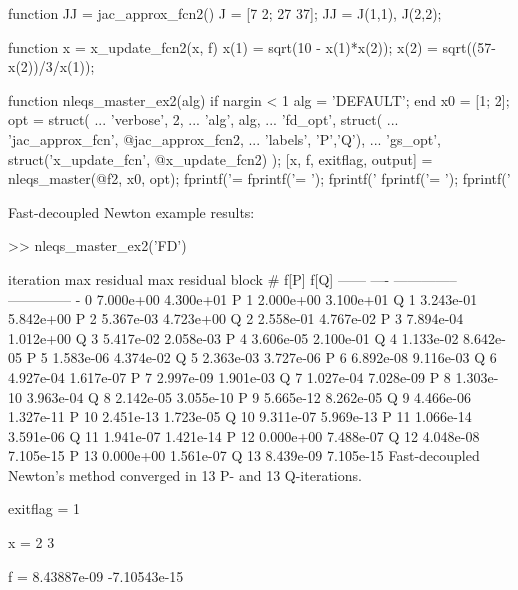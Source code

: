 \documentclass[12pt]{article}
\numberwithin{equation}{section}
\numberwithin{table}{section}
\numberwithin{figure}{section}
\begin{document}
\begin{Code}
function JJ = jac_approx_fcn2()
J = [7 2; 27 37];
JJ = {J(1,1), J(2,2)};
\end{Code}

\begin{Code}
function x = x_update_fcn2(x, f)
x(1) = sqrt(10 - x(1)*x(2));
x(2) = sqrt((57-x(2))/3/x(1));
\end{Code}

\begin{Code}
function nleqs_master_ex2(alg)
if nargin < 1
    alg = 'DEFAULT';
end
x0 = [1; 2];
opt = struct( ...
    'verbose', 2, ...
    'alg', alg, ...
    'fd_opt', struct( ...
        'jac_approx_fcn', @jac_approx_fcn2, ...
        'labels', {{'P','Q'}}), ...
    'gs_opt', struct('x_update_fcn', @x_update_fcn2) );
[x, f, exitflag, output] = nleqs_master(@f2, x0, opt);
fprintf('\nexitflag = %
fprintf('\nx = \n');
fprintf('   %
fprintf('\nf = \n');
fprintf('   %
\end{Code}

\clearpage
\noindent Fast-decoupled Newton example results:
\begin{Code}
>> nleqs_master_ex2('FD')

 iteration    max residual    max residual 
block    #        f[P]            f[Q]     
------ ----  --------------  --------------
  -      0       7.000e+00       4.300e+01
  P      1       2.000e+00       3.100e+01
  Q      1       3.243e-01       5.842e+00
  P      2       5.367e-03       4.723e+00
  Q      2       2.558e-01       4.767e-02
  P      3       7.894e-04       1.012e+00
  Q      3       5.417e-02       2.058e-03
  P      4       3.606e-05       2.100e-01
  Q      4       1.133e-02       8.642e-05
  P      5       1.583e-06       4.374e-02
  Q      5       2.363e-03       3.727e-06
  P      6       6.892e-08       9.116e-03
  Q      6       4.927e-04       1.617e-07
  P      7       2.997e-09       1.901e-03
  Q      7       1.027e-04       7.028e-09
  P      8       1.303e-10       3.963e-04
  Q      8       2.142e-05       3.055e-10
  P      9       5.665e-12       8.262e-05
  Q      9       4.466e-06       1.327e-11
  P     10       2.451e-13       1.723e-05
  Q     10       9.311e-07       5.969e-13
  P     11       1.066e-14       3.591e-06
  Q     11       1.941e-07       1.421e-14
  P     12       0.000e+00       7.488e-07
  Q     12       4.048e-08       7.105e-15
  P     13       0.000e+00       1.561e-07
  Q     13       8.439e-09       7.105e-15
Fast-decoupled Newton's method converged in 13 P- and 13 Q-iterations.

exitflag = 1

x = 
    2
    3

f = 
    8.43887e-09
   -7.10543e-15
\end{Code}
\end{document}
